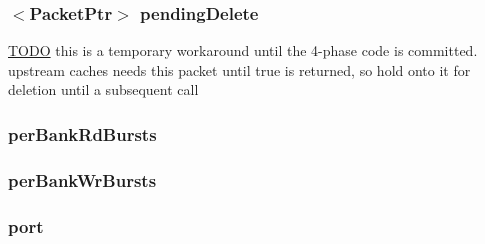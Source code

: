 \label{classDRAMCtrl_af80252f1fcfad371b526eac5f9bf7e4f}
\hypertarget{classDRAMCtrl_a21da4bea3554874b557428e4cce5d4a4}{
\subsubsection[{pendingDelete}]{$<${\bf PacketPtr}$>$ {\bf pendingDelete}}}
\label{classDRAMCtrl_a21da4bea3554874b557428e4cce5d4a4}
\begin{Desc}
\item[\hyperlink{todo__todo000083}{TODO}]this is a temporary workaround until the 4-\/phase code is committed. upstream caches needs this packet until true is returned, so hold onto it for deletion until a subsequent call \end{Desc}
\hypertarget{classDRAMCtrl_a1a6c6b88a19805ae5453e5811633f884}{
\subsubsection[{perBankRdBursts}]{ {\bf perBankRdBursts}}}
\label{classDRAMCtrl_a1a6c6b88a19805ae5453e5811633f884}
\hypertarget{classDRAMCtrl_ae757d149b2ff05a908b6ceb28f53decc}{
\subsubsection[{perBankWrBursts}]{ {\bf perBankWrBursts}}}
\label{classDRAMCtrl_ae757d149b2ff05a908b6ceb28f53decc}
\hypertarget{classDRAMCtrl_a55c076720c982014096b57cadebf9a14}{
\subsubsection[{port}]{ {\bf port}}}
